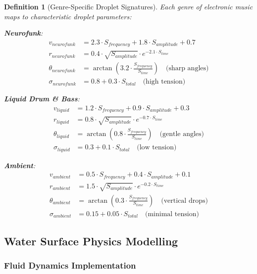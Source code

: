 \documentclass[12pt,a4paper]{article}
\newtheorem{definition}{Definition}
\begin{document}
\begin{definition}[Genre-Specific Droplet Signatures]
Each genre of electronic music maps to characteristic droplet parameters:

\textbf{Neurofunk}:
\begin{align}
v_{neurofunk} &= 2.3 \cdot S_{frequency} + 1.8 \cdot S_{amplitude} + 0.7 \\
r_{neurofunk} &= 0.4 \cdot \sqrt{S_{amplitude}} \cdot e^{-2.1 \cdot S_{time}} \\
\theta_{neurofunk} &= \arctan(3.2 \cdot \frac{S_{frequency}}{S_{time}}) \quad \text{(sharp angles)} \\
\sigma_{neurofunk} &= 0.8 + 0.3 \cdot S_{total} \quad \text{(high tension)}
\end{align}

\textbf{Liquid Drum \& Bass}:
\begin{align}
v_{liquid} &= 1.2 \cdot S_{frequency} + 0.9 \cdot S_{amplitude} + 0.3 \\
r_{liquid} &= 0.8 \cdot \sqrt{S_{amplitude}} \cdot e^{-0.7 \cdot S_{time}} \\
\theta_{liquid} &= \arctan(0.8 \cdot \frac{S_{frequency}}{S_{time}}) \quad \text{(gentle angles)} \\
\sigma_{liquid} &= 0.3 + 0.1 \cdot S_{total} \quad \text{(low tension)}
\end{align}

\textbf{Ambient}:
\begin{align}
v_{ambient} &= 0.5 \cdot S_{frequency} + 0.4 \cdot S_{amplitude} + 0.1 \\
r_{ambient} &= 1.5 \cdot \sqrt{S_{amplitude}} \cdot e^{-0.2 \cdot S_{time}} \\
\theta_{ambient} &= \arctan(0.3 \cdot \frac{S_{frequency}}{S_{time}}) \quad \text{(vertical drops)} \\
\sigma_{ambient} &= 0.15 + 0.05 \cdot S_{total} \quad \text{(minimal tension)}
\end{align}
\end{definition}

\subsection{Water Surface Physics Modelling}

\subsubsection{Fluid Dynamics Implementation}
\end{document}
